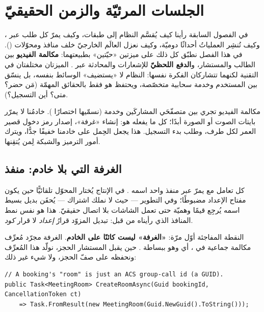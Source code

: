 \section{الجلسات المرئيّة والزمن الحقيقيّ}

في الفصول السابقة رأينا كيف يُقسَّم النظام إلى طبقات، وكيف يمرّ كل طلب عبر
، وكيف تُنشِر العملياتُ أحداثًا دوميّة، وكيف نعزل العالَم الخارجيّ خلف
منافذ ومحوّلات (). في هذا الفصل نطبّق كل ذلك على ميزتين
«حيّتين» بطبيعتهما: \textbf{مكالمة الفيديو} بين الطالب والمستشار، و\textbf{الدفع
اللحظيّ} للإشعارات والمحادثة عبر . الميزتان مختلفتان في التقنية لكنهما
تتشاركان الفكرة نفسها: النظام لا «يستضيف» الوسائط بنفسه، بل ينسّق بين المستخدم
وخدمة سحابية متخصّصة، ويحتفظ هو فقط بالحقائق المهمّة (مَن حضر؟ متى؟ أين التسجيل؟).

\begin{idea}
مكالمة الفيديو تجري بين متصفّحَي المشاركَين وخدمة 
(نسمّيها اختصارًا ). خادمُنا  لا يمرّر بايتات الصوت أو الصورة أبدًا؛
كل ما يفعله هو: إنشاء «غرفة»، إصدار رمز دخول قصير العمر لكل طرف، وطلب بدء التسجيل.
هذا يجعل الحِمل على خادمنا خفيفًا جدًّا، ويترك أمور الترميز والشبكة لِمن يُتقِنها.
\end{idea}

\subsection{الغرفة التي بلا خادم: منفذ }

كل تعامل مع  يمرّ عبر منفذ واحد اسمه . في الإنتاج
يُختار المحوّل  تلقائيًّا حين يكون مفتاح
الإعداد  مضبوطًا؛ وفي التطوير — حيث لا نملك اشتراك
 — يُحقَن بديل بسيط اسمه  يُرجِع قيمًا وهميّة حتى
تعمل الشاشات بلا اتصال حقيقيّ. هذا هو نفس نمط المنافذ الذي رأيناه من قبل: تبديل
المزوّد قرارُ \emph{إعداد} لا قرار \emph{كود}.

النقطة المفاجئة أوّل مرّة: \textbf{«الغرفة» ليست كائنًا على الخادم}. الغرفة مجرّد
مُعرِّف مكالمة جماعية في ، أي  وهو ببساطة . حين
يقبل المستشار الحجز، نولّد هذا المُعرِّف ونحفظه على صفّ الحجز، ولا شيء غير ذلك:

\begin{english}
\begin{lstlisting}[language={[Sharp]C}]
// A booking's "room" is just an ACS group-call id (a GUID).
public Task<MeetingRoom> CreateRoomAsync(Guid bookingId, CancellationToken ct)
    => Task.FromResult(new MeetingRoom(Guid.NewGuid().ToString()));
\end{lstlisting}
\end{english}

